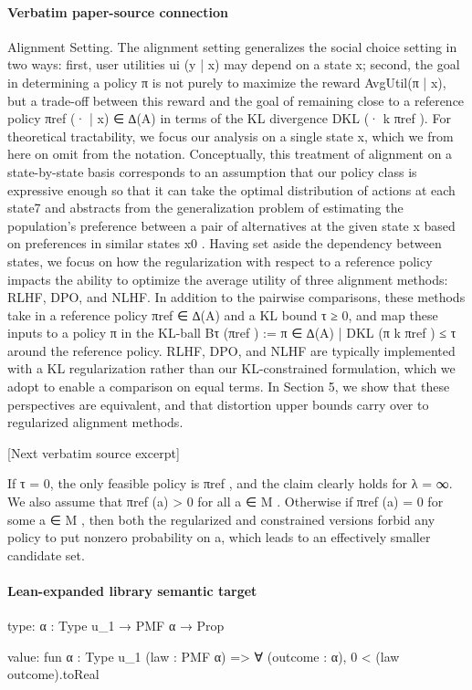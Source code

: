 \documentclass[10pt]{article}
\begin{document}
\paragraph{Verbatim paper-source connection}
\begin{ReviewVerbatim}
Alignment Setting. The alignment setting generalizes the social choice setting in two ways: first,
user utilities ui (y | x) may depend on a state x; second, the goal in determining a policy π is not
purely to maximize the reward AvgUtil(π | x), but a trade-off between this reward and the goal of
remaining close to a reference policy πref (· | x) ∈ ∆(A) in terms of the KL divergence DKL (· k πref ).
For theoretical tractability, we focus our analysis on a single state x, which we from here on omit
from the notation. Conceptually, this treatment of alignment on a state-by-state basis corresponds to
an assumption that our policy class is expressive enough so that it can take the optimal distribution of
actions at each state7 and abstracts from the generalization problem of estimating the population’s
preference between a pair of alternatives at the given state x based on preferences in similar states x0 .
Having set aside the dependency between states, we focus on how the regularization with respect
to a reference policy impacts the ability to optimize the average utility of three alignment methods:
RLHF, DPO, and NLHF. In addition to the pairwise comparisons, these methods take in a reference
policy πref ∈ ∆(A) and a KL bound τ ≥ 0, and map these inputs to a policy π in the KL-ball
Bτ (πref ) := {π ∈ ∆(A) | DKL (π k πref ) ≤ τ } around the reference policy. RLHF, DPO, and NLHF
are typically implemented with a KL regularization rather than our KL-constrained formulation,
which we adopt to enable a comparison on equal terms. In Section 5, we show that these perspectives
are equivalent, and that distortion upper bounds carry over to regularized alignment methods.

[Next verbatim source excerpt]

      If τ = 0, the only feasible policy is πref , and the claim clearly holds for λ = ∞. We also assume that
πref (a) > 0 for all a ∈ M . Otherwise if πref (a) = 0 for some a ∈ M , then both the regularized and constrained
versions forbid any policy to put nonzero probability on a, which leads to an effectively smaller candidate set.
\end{ReviewVerbatim}



\paragraph{Lean-expanded library semantic target}
\begin{ReviewVerbatim}
type:
{α : Type u_1} → PMF α → Prop

value:
fun {α : Type u_1} (law : PMF α) => ∀ (outcome : α), 0 < (law outcome).toReal
\end{ReviewVerbatim}
\end{document}
